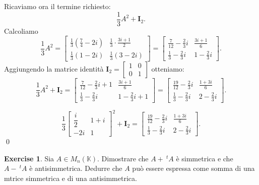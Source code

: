 \documentclass{article}
\theoremstyle{plain}
\theoremstyle{definition}
\newtheorem{xca}[exmp]{Exercise}
\theoremstyle{remark}
\begin{document}
Ricaviamo ora il termine richiesto:
\[
\dfrac{1}{3}A^2+\mathbf{I}_2.
\]
Calcoliamo
\[
\dfrac{1}{3}A^2=
\begin{bmatrix}
\frac{1}{3}\left(\frac{7}{4}-2i\right)& \frac{1}{3}\cdot\frac{3i+1}{2}\\[2mm]
\frac{1}{3}(1-2i)& \frac{1}{3}(3-2i)
\end{bmatrix}
=\begin{bmatrix}
\frac{7}{12}-\frac{2}{3}i & \frac{3i+1}{6}\\[2mm]
\frac{1}{3}-\frac{2}{3}i & 1-\frac{2}{3}i
\end{bmatrix}.
\]
Aggiungendo la matrice identità \(\mathbf{I}_2=\begin{bmatrix}1&0\\[2mm]0&1\end{bmatrix}\) otteniamo:
\[
\dfrac{1}{3}A^2+\mathbf{I}_2=
\begin{bmatrix}
\frac{7}{12}-\frac{2}{3}i+1 & \frac{3i+1}{6}\\[2mm]
\frac{1}{3}-\frac{2}{3}i & 1-\frac{2}{3}i+1
\end{bmatrix}
=\begin{bmatrix}
\frac{19}{12}-\frac{2}{3}i & \frac{1+3i}{6}\\[2mm]
\frac{1}{3}-\frac{2}{3}i & 2-\frac{2}{3}i
\end{bmatrix}.
\]

\[
\boxed{\dfrac{1}{3}\begin{bmatrix}
\dfrac{i}{2}&1+i\\[2mm]
-2i&1
\end{bmatrix}^2+\mathbf{I}_2
=\begin{bmatrix}
\frac{19}{12}-\frac{2}{3}i & \frac{1+3i}{6}\\[2mm]
\frac{1}{3}-\frac{2}{3}i & 2-\frac{2}{3}i
\end{bmatrix}.}
\]
\qed

\vspace{10pt}

\begin{bxthm}
\begin{xca}
    Sia $A\in M_n(\mathbb{K})$. Dimostrare che $A+\ ^{t}A$ è simmetrica e che $A-\ ^{t}A$ è antisimmetrica. 
    Dedurre che $A$ può essere espressa come somma di una mtrice simmetrica e di una antisimmetrica.
\end{xca}
\end{bxthm}

\vspace{10pt}
\end{document}
